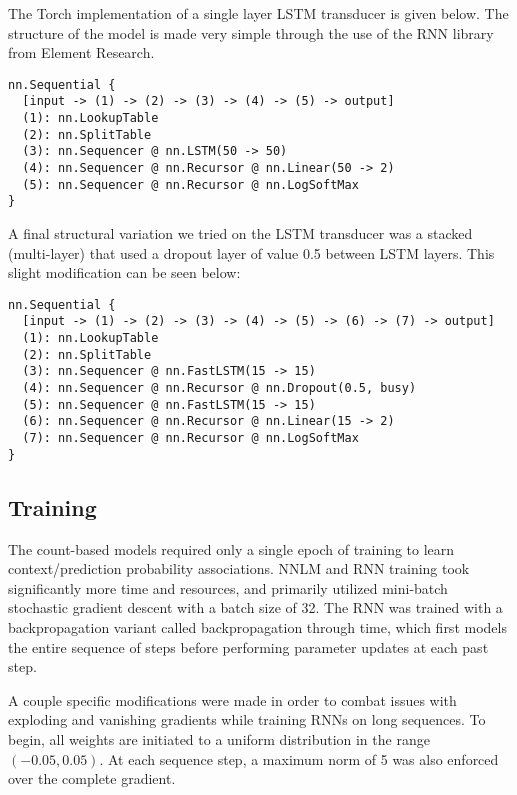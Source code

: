 \documentclass[11pt]{article}
\begin{document}
The Torch implementation of a single layer LSTM transducer is given below. The structure of the model is made very simple through the use of the RNN library from Element Research.
\begin{verbatim}
nn.Sequential {
  [input -> (1) -> (2) -> (3) -> (4) -> (5) -> output]
  (1): nn.LookupTable
  (2): nn.SplitTable
  (3): nn.Sequencer @ nn.LSTM(50 -> 50)
  (4): nn.Sequencer @ nn.Recursor @ nn.Linear(50 -> 2)
  (5): nn.Sequencer @ nn.Recursor @ nn.LogSoftMax
}
\end{verbatim}

A final structural variation we tried on the LSTM transducer was a stacked (multi-layer) that used a dropout layer of value 0.5 between LSTM layers. This slight modification can be seen below:
\begin{verbatim}
nn.Sequential {
  [input -> (1) -> (2) -> (3) -> (4) -> (5) -> (6) -> (7) -> output]
  (1): nn.LookupTable
  (2): nn.SplitTable
  (3): nn.Sequencer @ nn.FastLSTM(15 -> 15)
  (4): nn.Sequencer @ nn.Recursor @ nn.Dropout(0.5, busy)
  (5): nn.Sequencer @ nn.FastLSTM(15 -> 15)
  (6): nn.Sequencer @ nn.Recursor @ nn.Linear(15 -> 2)
  (7): nn.Sequencer @ nn.Recursor @ nn.LogSoftMax
}
\end{verbatim}

\subsection{Training}
The count-based models required only a single epoch of training to learn context/prediction probability associations. NNLM and RNN training took significantly more time and resources, and primarily utilized mini-batch stochastic gradient descent with a batch size of 32. The RNN was trained with a backpropagation variant called backpropagation through time, which first models the entire sequence of steps before performing parameter updates at each past step.

A couple specific modifications were made in order to combat issues with exploding and vanishing gradients while training RNNs on long sequences. To begin, all weights are initiated to a uniform distribution in the range $(-0.05, 0.05)$. At each sequence step, a maximum norm of 5 was also enforced over the complete gradient.
\end{document}

